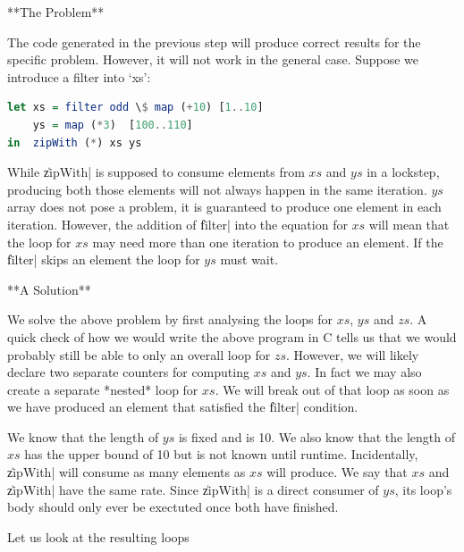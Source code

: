 \documentclass[preamble.tex]{subfiles}
\begin{document}
**The Problem**

The code generated in the previous step will produce correct results for the specific problem. However, it will not work in the general case. Suppose we introduce a filter into `xs':

\begin{lstlisting}[language=haskell]
let xs = filter odd \$ map (+10) [1..10]
    ys = map (*3)  [100..110]
in  zipWith (*) xs ys
\end{lstlisting}

While \|zipWith| is supposed to consume elements from $xs$ and $ys$ in a lockstep, producing both those elements will not always happen in the same iteration. $ys$ array does not pose a problem, it is guaranteed to produce one element in each iteration. However, the addition of \|filter| into the equation for $xs$ will mean that the loop for $xs$ may need more than one iteration to produce an element. If the \|filter| skips an element the loop for $ys$ must wait.

**A Solution**

We solve the above problem by first analysing the loops for $xs$, $ys$ and $zs$. A quick check of how we would write the above program in C tells us that we would probably still be able to only an overall loop for $zs$. However, we will likely declare two separate counters for computing $xs$ and $ys$. In fact we may also create a separate *nested* loop for $xs$. We will break out of that loop as soon as we have produced an element that satisfied the \|filter| condition.

We know that the length of $ys$ is fixed and is 10. We also know that the length of $xs$ has the upper bound of 10 but is not known until runtime. Incidentally, \|zipWith| will consume as many elements as $xs$ will produce. We say that $xs$ and \|zipWith| have the same rate. Since \|zipWith| is a direct consumer of $ys$, its loop's body should only ever be exectuted once both have finished.

Let us look at the resulting loops
\end{document}
